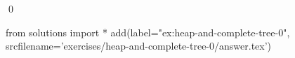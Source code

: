 
\begin{ex} 
  \label{ex:heap-and-complete-tree-0}
  
  \qed
\end{ex} 
\begin{python0}
from solutions import *
add(label="ex:heap-and-complete-tree-0",
    srcfilename='exercises/heap-and-complete-tree-0/answer.tex') 
\end{python0}
